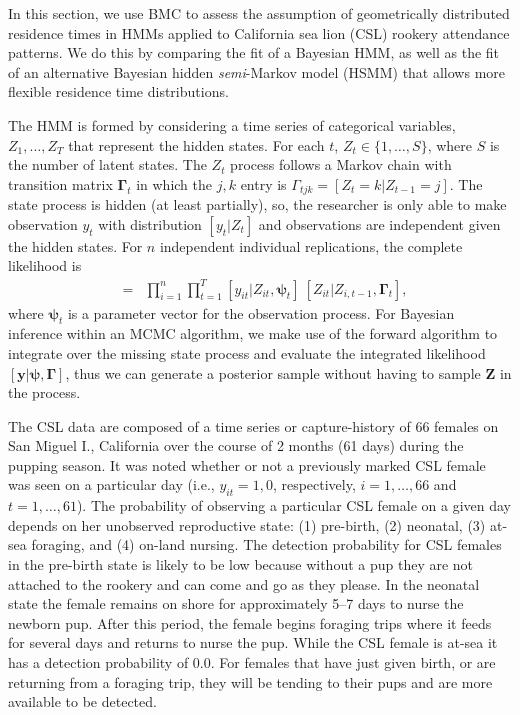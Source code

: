 \documentclass[12pt,english]{article}
\begin{document}
\begin{spacing}{1.9}
In this section, we use BMC to assess the assumption of geometrically
distributed residence times in HMMs applied to California sea lion
(CSL) rookery attendance patterns.  We do this by comparing the fit of
a Bayesian HMM, as well as the fit of an alternative Bayesian hidden
\textit{semi}-Markov model (HSMM) that allows more flexible residence
time distributions.


The HMM is formed by considering a time series of categorical
variables, $Z_{1}, \dots, Z_{T}$ that represent the hidden states. For
each $t$, $Z_{t} \in \{1, \dots, S\}$, where $S$ is the number of
latent states. The $Z_t$ process follows a Markov chain with
transition matrix $\boldsymbol{\Gamma}_t$ in which the $j,k$ entry is
$\Gamma_{tjk} = [Z_t = k | Z_{t-1} = j]$. The state process is hidden
(at least partially), so, the researcher is only able to make
observation $y_t$ with distribution $[y_t|Z_t]$ and observations are
independent given the hidden states. For $n$ independent individual
replications, the complete likelihood is
\begin{eqnarray*} [\mathbf{y}, \mathbf{Z}| \boldsymbol{\psi},
  \boldsymbol{\Gamma}] & = & \prod_{i=1}^n\prod_{t=1}^T
  [y_{it}|Z_{it}, \boldsymbol{\psi}_t]\
  [Z_{it}|Z_{i,t-1},\boldsymbol{\Gamma}_t],
\end{eqnarray*}
where $\boldsymbol{\psi}_t$ is a parameter vector for the observation
process. For Bayesian inference within an MCMC algorithm, we make use
of the forward algorithm \citep[see][]{zucchini2009hidden} to
integrate over the missing state process and evaluate the integrated
likelihood $[\mathbf{y}|\boldsymbol{\psi}, \boldsymbol{\Gamma}]$, thus
we can generate a posterior sample without having to sample
$\boldsymbol{Z}$ in the process.

The CSL data are composed of a time series or capture-history of 66
females on San Miguel I., California over the course of 2 months (61
days) during the pupping season. It was noted whether or not a
previously marked CSL female was seen on a particular day (i.e.,
$y_{it} =1,0$, respectively, $i=1,\dots,66$ and $t=1,\dots,61$). The
probability of observing a particular CSL female on a given day
depends on her unobserved reproductive state: (1) pre-birth, (2)
neonatal, (3) at-sea foraging, and (4) on-land nursing. The detection
probability for CSL females in the pre-birth state is likely to be low
because without a pup they are not attached to the rookery and can
come and go as they please. In the neonatal state the female remains
on shore for approximately 5--7 days to nurse the newborn pup. After
this period, the female begins foraging trips where it feeds for
several days and returns to nurse the pup. While the CSL female is
at-sea it has a detection probability of 0.0. For females that have
just given birth, or are returning from a foraging trip, they will be
tending to their pups and are more available to be detected.


\end{spacing}
\end{document}
